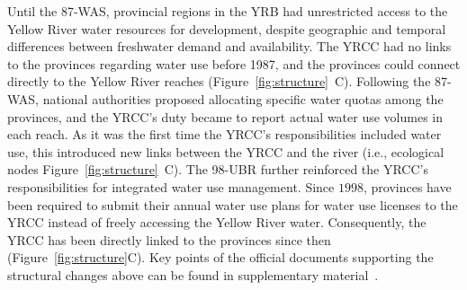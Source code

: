\documentclass[preprint, 12pt]{elsarticle}
\begin{document}
Until the 87-WAS, provincial regions in the YRB had unrestricted access to the Yellow River water resources for development, despite geographic and temporal differences between freshwater demand and availability.
The YRCC had no links to the provinces regarding water use before 1987, and the provinces could connect directly to the Yellow River reaches (Figure~\ref{fig:structure}~C).
Following the 87-WAS, national authorities proposed allocating specific water quotas among the provinces, and the YRCC's duty became to report actual water use volumes in each reach.
As it was the first time the YRCC's responsibilities included water use, this introduced new links between the YRCC and the river (i.e., ecological nodes Figure~\ref{fig:structure}~C).
The 98-UBR further reinforced the YRCC's responsibilities for integrated water use management.
Since $1998$, provinces have been required to submit their annual water use plans for water use licenses to the YRCC instead of freely accessing the Yellow River water.
Consequently, the YRCC has been directly linked to the provinces since then (Figure~\ref{fig:structure}C).
Key points of the official documents supporting the structural changes above can be found in supplementary material~\textit{}.
\end{document}
